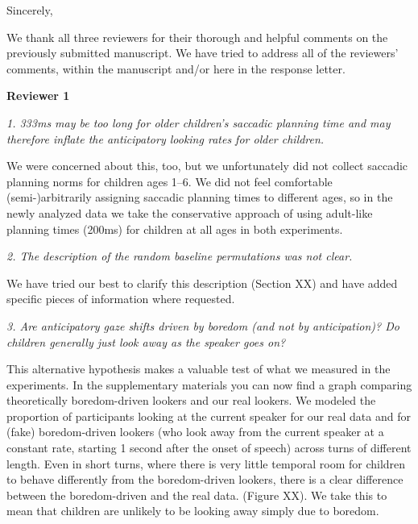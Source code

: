 \documentclass[11pt,a4paper]{letter} %
\begin{document}
\begin{letter}{}
\closing{Sincerely,}

\newpage

\noindent We thank all three reviewers for their thorough and helpful comments on the previously submitted manuscript. We have tried to address all of the reviewers' comments, within the manuscript and/or here in the response letter.

\medskip

\noindent \textbf{Reviewer 1}

\noindent \textit{1. 333ms may be too long for older children's saccadic planning time and may therefore inflate the anticipatory looking rates for older children.}

We were concerned about this, too, but we unfortunately did not collect saccadic planning norms for children ages 1--6. We did not feel comfortable (semi-)arbitrarily assigning saccadic planning times to different ages, so in the newly analyzed data we take the conservative approach of using adult-like planning times (200ms) for children at all ages in both experiments.

\smallskip

\noindent \textit{2. The description of the random baseline permutations was not clear.}

\noindent We have tried our best to clarify this description (Section XX) and have added specific pieces of information where requested.

\smallskip

\noindent \textit{3. Are anticipatory gaze shifts driven by boredom (and not by anticipation)? Do children generally just look away as the speaker goes on?}

\noindent This alternative hypothesis makes a valuable test of what we measured in the experiments. In the supplementary materials you can now find a graph comparing theoretically boredom-driven lookers and our real lookers. We modeled the proportion of participants looking at the current speaker for our real data and for (fake) boredom-driven lookers (who look away from the current speaker at a constant rate, starting 1 second after the onset of speech) across turns of different length. Even in short turns, where there is very little temporal room for children to behave differently from the boredom-driven lookers, there is a clear difference between the boredom-driven and the real data. (Figure XX). We take this to mean that children are unlikely to be looking away simply due to boredom.


\end{letter}
\end{document}
